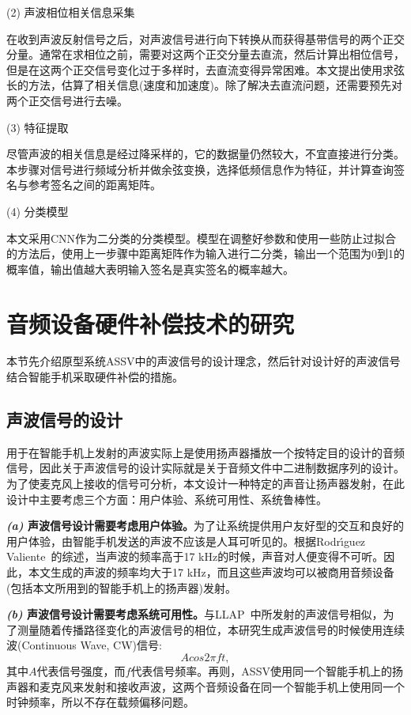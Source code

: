 (2) 声波相位相关信息采集

在收到声波反射信号之后，对声波信号进行向下转换从而获得基带信号的两个正交分量。通常在求相位之前，需要对这两个正交分量去直流，然后计算出相位信号，但是在这两个正交信号变化过于多样时，去直流变得异常困难。本文提出使用求弦长的方法，估算了相关信息(速度和加速度)。除了解决去直流问题，还需要预先对两个正交信号进行去噪。


(3) 特征提取

尽管声波的相关信息是经过降采样的，它的数据量仍然较大，不宜直接进行分类。本步骤对信号进行频域分析并做余弦变换，选择低频信息作为特征，并计算查询签名与参考签名之间的距离矩阵。

(4) 分类模型

本文采用CNN作为二分类的分类模型。模型在调整好参数和使用一些防止过拟合的方法后，使用上一步骤中距离矩阵作为输入进行二分类，输出一个范围为0到1的概率值，输出值越大表明输入签名是真实签名的概率越大。

\section{音频设备硬件补偿技术的研究}\label{sec:audio-research}

本节先介绍原型系统ASSV中的声波信号的设计理念，然后针对设计好的声波信号结合智能手机采取硬件补偿的措施。

\subsection{声波信号的设计}

用于在智能手机上发射的声波实际上是使用扬声器播放一个按特定目的设计的音频信号，因此关于声波信号的设计实际就是关于音频文件中二进制数据序列的设计。为了使麦克风上接收的信号可分析，本文设计一种特定的声音让扬声器发射，在此设计中主要考虑三个方面：用户体验、系统可用性、系统鲁棒性。

\textbf{\textit{(a)} 声波信号设计需要考虑用户体验。}为了让系统提供用户友好型的交互和良好的用户体验，由智能手机发送的声波不应该是人耳可听见的。根据Rodr{\'\i}guez Valiente~\cite{rodriguez2014extended}的综述，当声波的频率高于17 kHz的时候，声音对人便变得不可听。因此，本文生成的声波的频率均大于17 kHz，而且这些声波均可以被商用音频设备(包括本文所用到的智能手机上的扬声器)发射。

\textbf{\textit{(b)} 声波信号设计需要考虑系统可用性。}与LLAP~\cite{wang2016device}中所发射的声波信号相似，为了测量随着传播路径变化的声波信号的相位，本研究生成声波信号的时候使用连续波(Continuous Wave, CW)信号:
$$
Acos2\pi ft, 
$$
其中$A$代表信号强度，而$f$代表信号频率。再则，ASSV使用同一个智能手机上的扬声器和麦克风来发射和接收声波，这两个音频设备在同一个智能手机上使用同一个时钟频率，所以不存在载频偏移问题。

